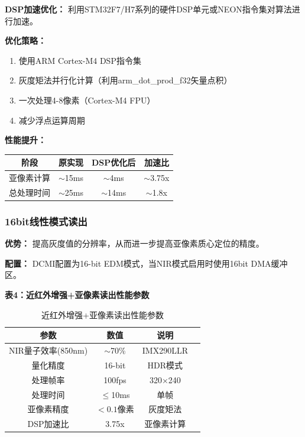 \documentclass[12pt, a4paper]{ctexart}
\begin{document}
\textbf{DSP加速优化：} 利用STM32F7/H7系列的硬件DSP单元或NEON指令集对算法进行加速。

\textbf{优化策略：}
\begin{enumerate}
\item 使用ARM Cortex-M4 DSP指令集
\item 灰度矩法并行化计算（利用arm\_dot\_prod\_f32矢量点积）
\item 一次处理4-8像素（Cortex-M4 FPU）
\item 减少浮点运算周期
\end{enumerate}

\textbf{性能提升：}

\begin{tabular}{cccc}
\toprule
阶段 & 原实现 & DSP优化后 & 加速比 \\
\midrule
亚像素计算 & $\sim$15ms & $\sim$4ms & $\sim$3.75x \\
总处理时间 & $\sim$25ms & $\sim$14ms & $\sim$1.8x \\
\bottomrule
\end{tabular}

\bigskip

\subsubsection{16bit线性模式读出}

\textbf{优势：} 提高灰度值的分辨率，从而进一步提高亚像素质心定位的精度。

\textbf{配置：} DCMI配置为16-bit EDM模式，当NIR模式启用时使用16bit DMA缓冲区。

\textbf{表4：近红外增强+亚像素读出性能参数}

\begin{table}[htbp]
\centering
\caption{近红外增强+亚像素读出性能参数}
\begin{tabular}{cccc}
\toprule
参数 & 数值 & 说明 \\
\midrule
NIR量子效率(850nm) & $\sim$70\% & IMX290LLR \\
量化精度 & 16-bit & HDR模式 \\
处理帧率 & 100fps & 320$\times$240 \\
处理时间 & $\le$10ms & 单帧 \\
亚像素精度 & $<0.1$像素 & 灰度矩法 \\
DSP加速比 & 3.75x & 亚像素计算 \\
\bottomrule
\end{tabular}
\end{table}
\end{document}
